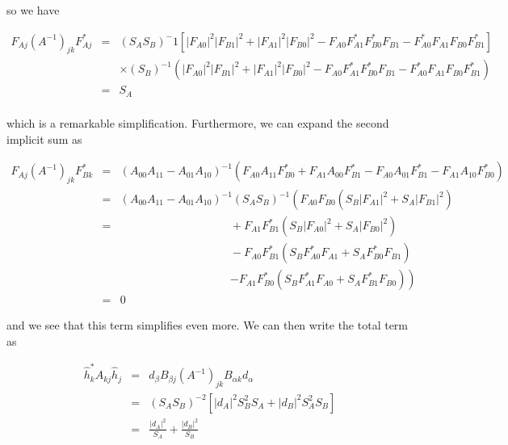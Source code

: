 \documentclass[10pt]{article}
\begin{document}
so we have

\begin{eqnarray}
F_{Aj} \left(A^{-1}\right)_{jk} F_{Aj}^\ast & = & (S_A S_B)^-1 \left[ |F_{A0}|^2|F_{B1}|^2 + |F_{A1}|^2|F_{B0}|^2 - F_{A0}F_{A1}^\ast F_{B0}^\ast F_{B1} - F_{A0}^\ast F_{A1} F_{B0} F_{B1}^\ast \right] \\
                                            &   & \times (S_B)^{-1}\left( |F_{A0}|^2|F_{B1}|^2 + |F_{A1}|^2|F_{B0}|^2 - F_{A0}F_{A1}^\ast F_{B0}^\ast F_{B1} - F_{A0}^\ast F_{A1} F_{B0} F_{B1}^\ast \right) \\
& = & S_A \\
\end{eqnarray}

which is a remarkable simplification. Furthermore, we can expand the second implicit sum as

\begin{eqnarray}
F_{Aj} \left(A^{-1}\right)_{jk} F_{Bk}^\ast & = & (A_{00}A_{11}-A_{01}A_{10})^{-1}\left( F_{A0}A_{11}F_{B0}^\ast + F_{A1}A_{00}F_{B1}^\ast - F_{A0}A_{01}F_{B1}^\ast - F_{A1}A_{10}F_{B0}^\ast \right) \\
& = & (A_{00}A_{11}-A_{01}A_{10})^{-1} (S_A S_B)^{-1} \left( F_{A0}F_{B0}( S_B|F_{A1}|^2 + S_A|F_{B1}|^2) \right.\\
& = & \ \ \ \ \ \ \ \ \ \ \ \ \ \ \ \ \ \ \ \ \ \ \ \ \ \ \ \ \ \ \ \ \ \ \ \ \ \ \ \ \ \ \ \ + F_{A1}F_{B1}^\ast(S_B|F_{A0}|^2 + S_A|F_{B0}|^2) \\
&  & \ \ \ \ \ \ \ \ \ \ \ \ \ \ \ \ \ \ \ \ \ \ \ \ \ \ \ \ \ \ \ \ \ \ \ \ \ \ \ \ \ \ \ \ - F_{A0}F_{B1}^\ast(S_B F_{A0}^\ast F_{A1} + S_A F_{B0}^\ast F_{B1}) \\
&  & \ \ \ \ \ \ \ \ \ \ \ \ \ \ \ \ \ \ \ \ \ \ \ \ \ \ \ \ \ \ \ \ \ \ \ \ \ \ \ \ \ \ \ \ \left. - F_{A1}F_{B0}^\ast(S_B F_{A1}^\ast F_{A0} + S_A F_{B1}^\ast F_{B0}) \right) \\
& = & 0 
\end{eqnarray}

and we see that this term simplifies even more. We can then write the total term as

\begin{eqnarray}
\hat{h}_k^\ast A_{kj} \hat{h}_j & = & d_\beta B_{\beta j} \left(A^{-1}\right)_{jk} B_{\alpha k} d_\alpha \\
& = & (S_A S_B)^{-2} \left[ |d_A|^2 S_B^2 S_A + |d_B|^2 S_A^2 S_B \right] \\
& = & \frac{|d_A|^2}{S_A} + \frac{|d_B|^2}{S_B}
\end{eqnarray}
\end{document}
